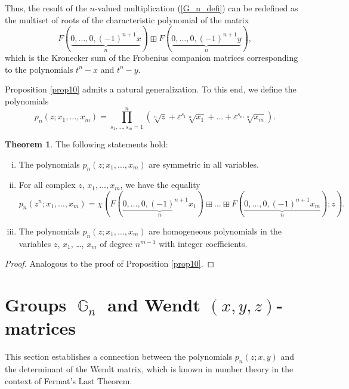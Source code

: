 \documentclass[14pt, dvipsnames]{extarticle}
\theoremstyle{definition}
\newtheorem{theorem}{Theorem}
\theoremstyle{definition}
\theoremstyle{remark}
\DeclareMathOperator{\G}{\mathbb{G}}
\renewcommand{\epsilon}{\varepsilon}
\begin{document}
Thus, the result of the $n$-valued multiplication (\ref{G_n_defi}) can be redefined as the multiset of roots of the characteristic polynomial of the matrix
$$F(\underset{n}{\underbrace{0,\dots,0,(-1)^{n+1}x}})\boxplus F(\underset{n}{\underbrace{0,\dots,0,(-1)^{n+1}y}}),$$
which is the Kronecker sum of the Frobenius companion matrices corresponding to the polynomials $t^n - x$ and $t^n - y$.

Proposition \ref{prop10} admits a natural generalization. To this end, we define the polynomials
\begin{equation}\label{gen_p_n}
p_n(z; x_1, \dots, x_m) = \prod\limits_{s_1, \dots, s_m = 1}^n (\sqrt[n]{z} + \epsilon^{s_1}\sqrt[n]{x_1} + \dots + \epsilon^{s_m}\sqrt[n]{x_m}).
\end{equation}

\begin{theorem}\label{thm1}
The following statements hold:
\begin{enumerate}[(i)]

\item The polynomials $p_n(z; x_1, \dots, x_m)$ are symmetric in all variables.

\item For all complex $z$, $x_1, \dots, x_m$, we have the equality
$$p_n(z^n; x_1, \dots, x_m) = \chi(F(\underset{n}{\underbrace{0,\dots,0,(-1)^{n+1}x_1}})\boxplus\dots\boxplus F(\underset{n}{\underbrace{0,\dots,0,(-1)^{n+1}x_m}}); z).$$

\item The polynomials $p_n(z; x_1, \dots, x_m)$ are homogeneous polynomials in the variables $z$, $x_1$, \dots, $x_m$ of degree $n^{m-1}$ with integer coefficients.
\end{enumerate}
\end{theorem}

\begin{proof}
Analogous to the proof of Proposition \ref{prop10}.
\end{proof}















\section{Groups $\G_n$ and  Wendt $(x, y, z)$-matrices}\label{G_n_and_Wendt}
This section establishes a connection between the polynomials $p_n(z; x, y)$ and the determinant of the Wendt matrix, which is known in number theory in the context of Fermat's Last Theorem.
\end{document}
